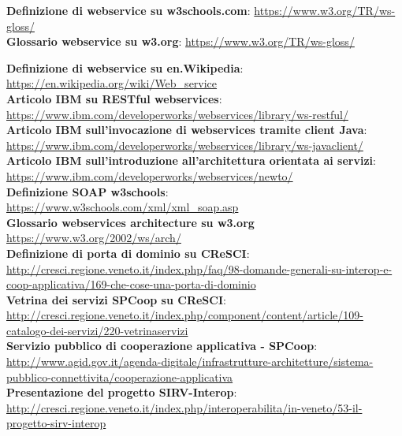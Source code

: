 \documentclass[a4paper]{article}
\begin{document}
\noindent
\textbf{Definizione di webservice su w3schools.com}: \url{https://www.w3.org/TR/ws-gloss/}
\\

\noindent
\textbf{Glossario webservice su w3.org}: \url{https://www.w3.org/TR/ws-gloss/}

\noindent
\textbf{Definizione di webservice su en.Wikipedia}: \url{https://en.wikipedia.org/wiki/Web_service}
\\

\noindent
\textbf{Articolo IBM su RESTful webservices}: \url{https://www.ibm.com/developerworks/webservices/library/ws-restful/}
\\

\noindent
\textbf{Articolo IBM sull'invocazione di webservices tramite client Java}: \url{https://www.ibm.com/developerworks/webservices/library/ws-javaclient/}
\\

\noindent
\textbf{Articolo IBM sull'introduzione all'architettura orientata ai servizi}: \url{https://www.ibm.com/developerworks/webservices/newto/}
\\

\noindent
\textbf{Definizione SOAP w3schools}: \url{https://www.w3schools.com/xml/xml_soap.asp}
\\

\noindent
\textbf{Glossario webservices architecture su w3.org} \url{https://www.w3.org/2002/ws/arch/}
\\

\noindent
\textbf{Definizione di porta di dominio su CReSCI}: \url{http://cresci.regione.veneto.it/index.php/faq/98-domande-generali-su-interop-e-coop-applicativa/169-che-cose-una-porta-di-dominio}
\\

\noindent
\textbf{Vetrina dei servizi SPCoop su CReSCI}: \url{http://cresci.regione.veneto.it/index.php/component/content/article/109-catalogo-dei-servizi/220-vetrinaservizi}
\\

\noindent
\textbf{Servizio pubblico di cooperazione applicativa - SPCoop}: \url{http://www.agid.gov.it/agenda-digitale/infrastrutture-architetture/sistema-pubblico-connettivita/cooperazione-applicativa}
\\

\noindent
\textbf{Presentazione del progetto SIRV-Interop}: \url{http://cresci.regione.veneto.it/index.php/interoperabilita/in-veneto/53-il-progetto-sirv-interop}
\\
\end{document}

